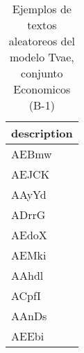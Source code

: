 \begin{table}[H]
\centering
\fontsize{8}{14}\selectfont
\caption{Ejemplos de textos aleatoreos del modelo Tvae, conjunto Economicos (B-1)}
\label{table-sample10-economicos-b-1-tvae-text}
\begin{tabular}{|m{50em}|}
\hline
\rowcolor[gray]{0.8}
description \\
\hline AEBmw \\
\hline AEJCK \\
\hline AAyYd \\
\hline ADrrG \\
\hline AEdoX \\
\hline AEMki \\
\hline AAhdl \\
\hline ACpfI \\
\hline AAnDs \\
\hline AEEbi \\
\hline
\end{tabular}
\end{table}
